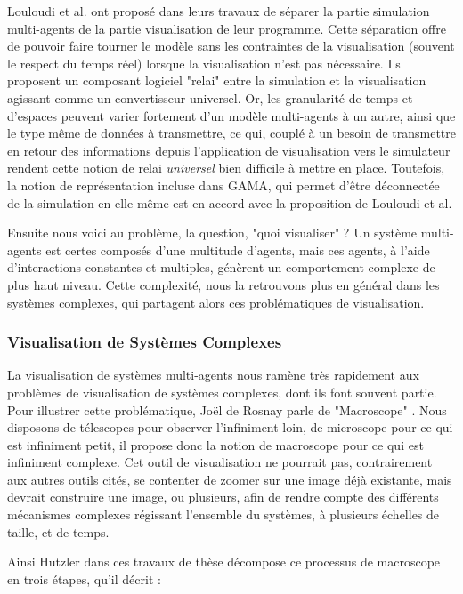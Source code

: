 		Louloudi et al. \cite{louloudi_new_2012} ont proposé dans leurs travaux de séparer la partie simulation multi-agents de la partie visualisation de leur programme. Cette séparation offre de pouvoir faire tourner le modèle sans les contraintes de la visualisation (souvent le respect du temps réel) lorsque la visualisation n'est pas nécessaire. Ils proposent un composant logiciel "relai" entre la simulation et la visualisation agissant comme un convertisseur universel. Or, les granularité de temps et d'espaces peuvent varier fortement d'un modèle multi-agents à un autre, ainsi que le type même de données à transmettre, ce qui, couplé à un besoin de transmettre en retour des informations depuis l'application de visualisation vers le simulateur rendent cette notion de relai \textit{universel} bien difficile à mettre en place. Toutefois, la notion de représentation incluse dans GAMA, qui permet d'être déconnectée de la simulation en elle même est en accord avec la proposition de Louloudi et al.
		
		Ensuite nous voici au problème, la question, "quoi visualiser" ? Un système multi-agents est certes composés d'une multitude d'agents, mais ces agents, à l'aide d'interactions constantes et multiples, génèrent un comportement complexe de plus haut niveau. Cette complexité, nous la retrouvons plus en général dans les systèmes complexes, qui partagent alors ces problématiques de visualisation.
		
		\subsubsection{Visualisation de Systèmes Complexes}
		
		La visualisation de systèmes multi-agents nous ramène très rapidement aux problèmes de visualisation de systèmes complexes, dont ils font souvent partie. Pour illustrer cette problématique, Joël de Rosnay parle de "Macroscope" \cite{de_rosnay_macroscope_1975}. Nous disposons de télescopes pour observer l'infiniment loin, de microscope pour ce qui est infiniment petit, il propose donc la notion de macroscope pour ce qui est infiniment complexe. Cet outil de visualisation ne pourrait pas, contrairement aux autres outils cités, se contenter de zoomer sur une image déjà existante, mais devrait construire une image, ou plusieurs, afin de rendre compte des différents mécanismes complexes régissant l'ensemble du systèmes, à plusieurs échelles de taille, et de temps.
		
		Ainsi Hutzler dans ces travaux de thèse \cite{hutzler_du_2000} décompose ce processus de macroscope en trois étapes, qu'il décrit :
		
